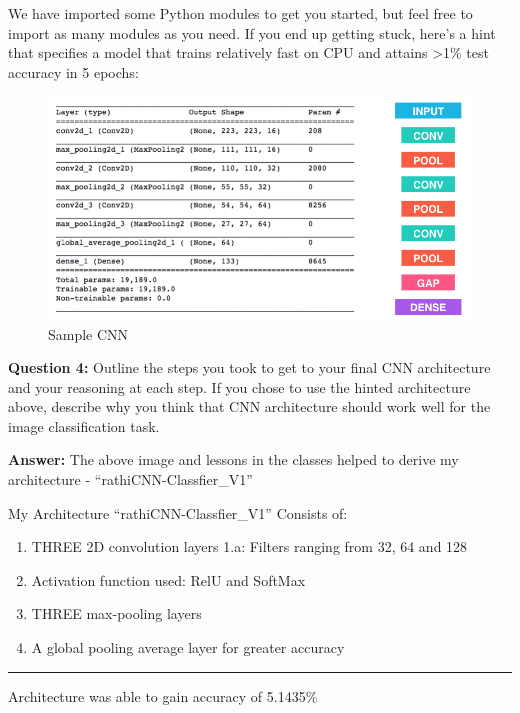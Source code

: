 \documentclass[11pt]{article}
\makeatletter
\def\maxwidth{\ifdim\Gin@nat@width>\linewidth\linewidth
    \else\Gin@nat@width\fi}
\let\Oldincludegraphics\includegraphics
\renewcommand{\includegraphics}[1]{\Oldincludegraphics[width=.8\maxwidth]{#1}}
\providecommand{\tightlist}{%
      \setlength{\itemsep}{0pt}\setlength{\parskip}{0pt}}
\makeatother
\begin{document}
We have imported some Python modules to get you started, but feel free
to import as many modules as you need. If you end up getting stuck,
here's a hint that specifies a model that trains relatively fast on CPU
and attains \textgreater{}1\% test accuracy in 5 epochs:

\begin{figure}
\centering
\includegraphics{images/sample_cnn.png}
\caption{Sample CNN}
\end{figure}

\textbf{Question 4:} Outline the steps you took to get to your final CNN
architecture and your reasoning at each step. If you chose to use the
hinted architecture above, describe why you think that CNN architecture
should work well for the image classification task.

\textbf{Answer:} The above image and lessons in the classes helped to
derive my architecture - ``rathiCNN-Classfier\_V1''

My Architecture ``rathiCNN-Classfier\_V1'' Consists of:

\begin{enumerate}
\def\labelenumi{\arabic{enumi}.}
\tightlist
\item
  THREE 2D convolution layers 1.a: Filters ranging from 32, 64 and 128
\item
  Activation function used: RelU and SoftMax
\item
  THREE max-pooling layers
\item
  A global pooling average layer for greater accuracy
\end{enumerate}

\begin{center}\rule{0.5\linewidth}{\linethickness}\end{center}

Architecture was able to gain accuracy of 5.1435\%
\end{document}
